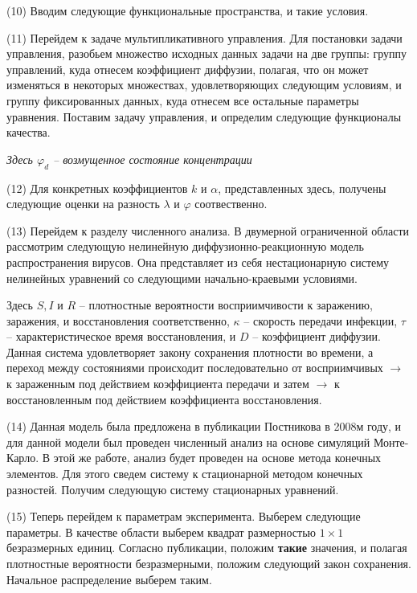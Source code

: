 \documentclass[14pt, a4paper]{extarticle}
\begin{document}
	(10) Вводим следующие функциональные пространства, и такие условия.

	(11) Перейдем к задаче мультипликативного управления. Для постановки задачи управления, разобьем множество исходных данных задачи на две группы: группу управлений, куда отнесем коэффициент диффузии, полагая, что он может изменяться в некоторых множествах, удовлетворяющих следующим условиям, и группу фиксированных данных, куда отнесем все остальные параметры уравнения.
	Поставим задачу управления, и определим следующие функционалы качества. 

	\textit{\small Здесь $\varphi_d$ -- возмущенное состояние концентрации}

	(12) Для конкретных коэффициентов $k$ и $\alpha$, представленных здесь, получены следующие оценки на разность $\lambda$ и $\varphi$ соотвественно.

	(13) Перейдем к разделу численного анализа. В двумерной ограниченной области рассмотрим следующую нелинейную диффузионно-реакционную модель распространения вирусов. Она представляет из себя нестационарную систему нелинейных уравнений со следующими начально-краевыми условиями.

	Здесь $S, I$ и $R$ -- плотностные вероятности восприимчивости к заражению, заражения, и восстановления соответственно, $\kappa$ -- скорость передачи инфекции, $\tau$ -- характеристическое время восстановления, и $D$ -- коэффициент диффузии. Данная система удовлетворяет закону сохранения плотности во времени, а переход между состояниями происходит последовательно от восприимчивых $\to$ к зараженным под действием коэффициента передачи и затем $\to$ к восстановленным под действием коэффициента восстановления.

	(14) Данная модель была предложена в публикации Постникова в 2008м году, и для данной модели был проведен численный анализ на основе симуляций Монте-Карло. В этой же работе, анализ будет проведен на основе метода конечных элементов. Для этого сведем систему к стационарной методом конечных разностей. Получим следующую систему стационарных уравнений.

	(15) Теперь перейдем к параметрам эксперимента. Выберем следующие параметры. В качестве области выберем квадрат размерностью $1 \times 1$ безразмерных единиц. Согласно публикации, положим \textbf{такие} значения, и полагая плотностные вероятности безразмерными, положим следующий закон сохранения. Начальное распределение выберем таким. 
\end{document}
